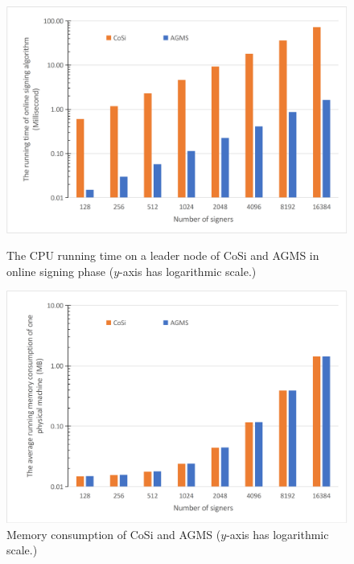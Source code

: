 \documentclass[journal]{IEEEtran}
\begin{document}
\begin{figure}
\begin{minipage}[t]{0.45\linewidth}
\centering
\includegraphics[width=\textwidth]{Fig6.jpg}
\caption{The CPU running time on a leader node of CoSi and AGMS in online signing phase ($y$-axis has logarithmic scale.)} \label{fig6}
\end{minipage}
\hfill
\begin{minipage}[t]{0.45\linewidth}
\centering
\includegraphics[width=\textwidth]{FigA1.jpg}
\caption{Memory consumption of CoSi and AGMS ($y$-axis has logarithmic scale.)}
\label{figmemory}
\end{minipage}
\end{figure}
\end{document}

